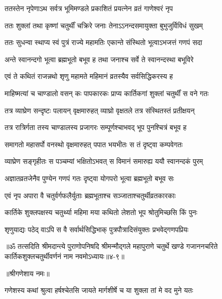 \twolineshloka
{ततस्तेन नृपेणाऽथ सर्वत्र भूमिमण्डले}
{प्रकाशितं प्रयत्नेन व्रतं गाणेश्वरं नृप} %

\twolineshloka
{ततः शुक्लां तथा कृष्णां चतुर्थीं चक्रिरे जनाः}
{तेनाऽऽनन्दसमायुक्ता बुभुजुर्विविधं सुखम्} %

\twolineshloka
{ततः सुधन्वा स्थाप्य स्वं पुत्रं राज्ये महामतिः}
{एकान्ते संस्थितो भूत्वाऽभजत्तं गणपं सदा} %

\twolineshloka
{अन्ते स्वानन्दगो भूत्वा ब्रह्मभूतो बभूव ह}
{तथा जनाश्च सर्वे ते स्वानन्दस्था बभूविरे} %

\twolineshloka
{एवं ते कथितं राजन्नथो श‍ृणु महामते}
{महिमानं व्रतस्यैव सर्वसिद्धिकरस्य ह} %

\twolineshloka
{माहिष्मत्यां च चाण्डालो वसन् कः पापकारकः}
{प्राप्य कार्तिकगां शुक्लां चतुर्थीं स वने गतः} %

\twolineshloka
{तत्र व्याघ्रेण सन्दृष्टः पलायन् वृक्षमारुहत्}
{व्याघ्रो वृक्षतले तत्र संस्थितस्तं प्रतीक्षयन्} %

\twolineshloka
{तत्र रात्रिर्गता तस्य चाण्डालस्य प्रजागरः}
{सम्पूर्णश्चाभवद् भूप पुनश्चित्रं बभूव ह} %

\twolineshloka
{समागतो महासर्पो वनस्थो वृक्षमारुहत्}
{पपात भयभीतः स तं दृष्ट्वा कम्पवेगतः} %

\twolineshloka
{व्याघ्रेण सङ्गृहीतः स पञ्चम्यां भक्षितोऽभवत्}
{स विमानं समारुह्य ययौ स्वानन्दकं पुरम्} %

\twolineshloka
{अज्ञातव्रतजेनैव पुण्येन गणपं गतः}
{दृष्ट्वा योगपरो भूत्वा ब्रह्मभूतो बभूव सः} %

\twolineshloka
{एवं नृप अपारा वै चतुर्वर्गफलैर्युताः}
{ब्रह्मभूताश्च सञ्जाताश्चतुर्थीव्रतकारकाः} %

\twolineshloka
{कार्तिके शुक्लपक्षस्य चतुर्थ्या महिमा मया}
{कथितो लेशतो भूप श्रोतुमिच्छसि किं पुनः} %

\twolineshloka
{श‍ृणुयाद्यः पठेद् वाऽपि स वै सर्वार्थसिद्धिभाक्}
{पुत्रपौत्रादिसंयुक्तः प्रभवेद्गणपप्रियः} %

॥ॐ तत्सदिति श्रीमदान्त्ये पुराणोपनिषदि श्रीमन्मौद्गले महापुराणे चतुर्थे खण्डे गजाननचरिते कार्तिकशुक्लचतुर्थीवर्णनं नाम नवमोऽध्यायः॥४-९॥


\label{sec:margashirsha-shukla-chaturthi-mahatmya-varnanam}

\centerline{॥श्रीगणेशाय नमः॥}


\twolineshloka
{गणेशस्य कथां श्रुत्वा हर्षश्चेतसि जायते}
{मार्गशीर्षे च या शुक्ला तां मे वद मुने यतः} %

